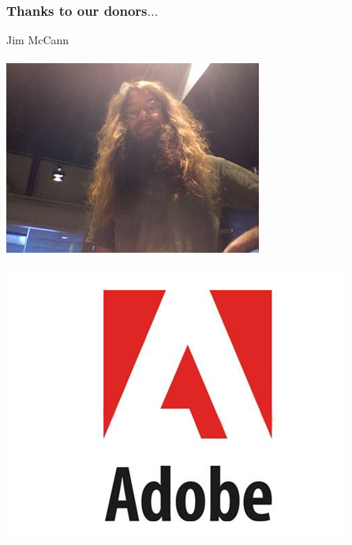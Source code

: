 \documentclass{beamer}
\begin{document}
\begin{frame}
\frametitle{Thanks to our donors$\dots$}
Jim McCann \\ ~ \\
\includegraphics[scale=.3]{mccann.jpg} \\ ~ \\
\includegraphics[scale=.25]{adobe.jpg}
\end{frame}
\end{document}
